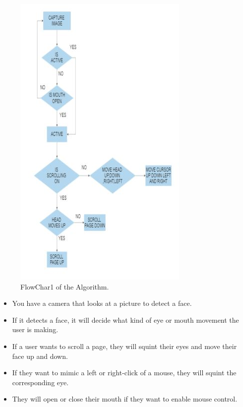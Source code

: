 \documentclass[conference]{IEEEtran}
\begin{document}
\begin{figure}[htbp]
\includegraphics[width=\columnwidth]{FlowChar1.JPG}
\caption{FlowChar1 of the Algorithm.}
\label{FlowChart1}
\end{figure}

\begin{itemize}
    \item You have a camera that looks at a picture to detect a face.
    \item If it detects a face, it will decide what kind of eye or mouth movement the user is making.
    \item If a user wants to scroll a page, they will squint their eyes and move their face up and down.
    \item If they want to mimic a left or right-click of a mouse, they will squint the corresponding eye.
    \item They will open or close their mouth if they want to enable mouse control.
\end{itemize}
\end{document}
